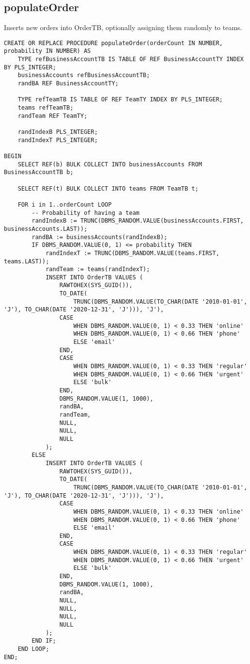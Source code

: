 \subsection*{populateOrder}
Inserts new orders into OrderTB, optionally assigning them randomly to teams.
\begin{lstlisting}
CREATE OR REPLACE PROCEDURE populateOrder(orderCount IN NUMBER, probability IN NUMBER) AS
    TYPE refBusinessAccountTB IS TABLE OF REF BusinessAccountTY INDEX BY PLS_INTEGER;
    businessAccounts refBusinessAccountTB;
    randBA REF BusinessAccountTY;

    TYPE refTeamTB IS TABLE OF REF TeamTY INDEX BY PLS_INTEGER;
    teams refTeamTB;
    randTeam REF TeamTY;

    randIndexB PLS_INTEGER;
    randIndexT PLS_INTEGER;

BEGIN
    SELECT REF(b) BULK COLLECT INTO businessAccounts FROM BusinessAccountTB b;

    SELECT REF(t) BULK COLLECT INTO teams FROM TeamTB t;

    FOR i in 1..orderCount LOOP
        -- Probability of having a team
        randIndexB := TRUNC(DBMS_RANDOM.VALUE(businessAccounts.FIRST, businessAccounts.LAST));
        randBA := businessAccounts(randIndexB);
        IF DBMS_RANDOM.VALUE(0, 1) <= probability THEN
            randIndexT := TRUNC(DBMS_RANDOM.VALUE(teams.FIRST, teams.LAST));
            randTeam := teams(randIndexT);
            INSERT INTO OrderTB VALUES (
                RAWTOHEX(SYS_GUID()),
                TO_DATE(
                    TRUNC(DBMS_RANDOM.VALUE(TO_CHAR(DATE '2010-01-01', 'J'), TO_CHAR(DATE '2020-12-31', 'J'))), 'J'),
                CASE
                    WHEN DBMS_RANDOM.VALUE(0, 1) < 0.33 THEN 'online'
                    WHEN DBMS_RANDOM.VALUE(0, 1) < 0.66 THEN 'phone'
                    ELSE 'email'
                END,
                CASE
                    WHEN DBMS_RANDOM.VALUE(0, 1) < 0.33 THEN 'regular'
                    WHEN DBMS_RANDOM.VALUE(0, 1) < 0.66 THEN 'urgent'
                    ELSE 'bulk'
                END,
                DBMS_RANDOM.VALUE(1, 1000),
                randBA,
                randTeam,
                NULL,
                NULL,
                NULL
            );
        ELSE
            INSERT INTO OrderTB VALUES (
                RAWTOHEX(SYS_GUID()),
                TO_DATE(
                    TRUNC(DBMS_RANDOM.VALUE(TO_CHAR(DATE '2010-01-01', 'J'), TO_CHAR(DATE '2020-12-31', 'J'))), 'J'),
                CASE
                    WHEN DBMS_RANDOM.VALUE(0, 1) < 0.33 THEN 'online'
                    WHEN DBMS_RANDOM.VALUE(0, 1) < 0.66 THEN 'phone'
                    ELSE 'email'
                END,
                CASE
                    WHEN DBMS_RANDOM.VALUE(0, 1) < 0.33 THEN 'regular'
                    WHEN DBMS_RANDOM.VALUE(0, 1) < 0.66 THEN 'urgent'
                    ELSE 'bulk'
                END,
                DBMS_RANDOM.VALUE(1, 1000),
                randBA,
                NULL,
                NULL,
                NULL,
                NULL
            );
        END IF;
    END LOOP;
END;
\end{lstlisting}

